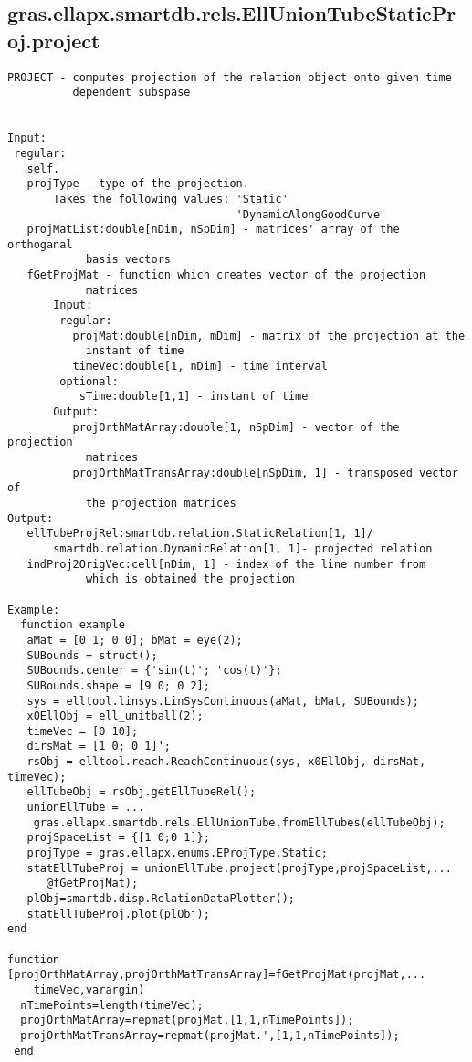 \subsection{\texorpdfstring{gras.ellapx.smartdb.rels.EllUnionTubeStaticProj.project}{project}}\label{method:gras.ellapx.smartdb.rels.EllUnionTubeStaticProj.project}
\begin{verbatim}
PROJECT - computes projection of the relation object onto given time
          dependent subspase


Input:
 regular:
   self.
   projType - type of the projection.
       Takes the following values: 'Static'
                                   'DynamicAlongGoodCurve'
   projMatList:double[nDim, nSpDim] - matrices' array of the orthoganal
            basis vectors
   fGetProjMat - function which creates vector of the projection
            matrices
       Input:
        regular:
          projMat:double[nDim, mDim] - matrix of the projection at the
            instant of time
          timeVec:double[1, nDim] - time interval
        optional:
           sTime:double[1,1] - instant of time
       Output:
          projOrthMatArray:double[1, nSpDim] - vector of the projection
            matrices
          projOrthMatTransArray:double[nSpDim, 1] - transposed vector of
            the projection matrices
Output:
   ellTubeProjRel:smartdb.relation.StaticRelation[1, 1]/
       smartdb.relation.DynamicRelation[1, 1]- projected relation
   indProj2OrigVec:cell[nDim, 1] - index of the line number from
            which is obtained the projection

Example:
  function example
   aMat = [0 1; 0 0]; bMat = eye(2);
   SUBounds = struct();
   SUBounds.center = {'sin(t)'; 'cos(t)'};
   SUBounds.shape = [9 0; 0 2];
   sys = elltool.linsys.LinSysContinuous(aMat, bMat, SUBounds);
   x0EllObj = ell_unitball(2);
   timeVec = [0 10];
   dirsMat = [1 0; 0 1]';
   rsObj = elltool.reach.ReachContinuous(sys, x0EllObj, dirsMat, timeVec);
   ellTubeObj = rsObj.getEllTubeRel();
   unionEllTube = ...
    gras.ellapx.smartdb.rels.EllUnionTube.fromEllTubes(ellTubeObj);
   projSpaceList = {[1 0;0 1]};
   projType = gras.ellapx.enums.EProjType.Static;
   statEllTubeProj = unionEllTube.project(projType,projSpaceList,...
      @fGetProjMat);
   plObj=smartdb.disp.RelationDataPlotter();
   statEllTubeProj.plot(plObj);
end

function [projOrthMatArray,projOrthMatTransArray]=fGetProjMat(projMat,...
    timeVec,varargin)
  nTimePoints=length(timeVec);
  projOrthMatArray=repmat(projMat,[1,1,nTimePoints]);
  projOrthMatTransArray=repmat(projMat.',[1,1,nTimePoints]);
 end
\end{verbatim}
